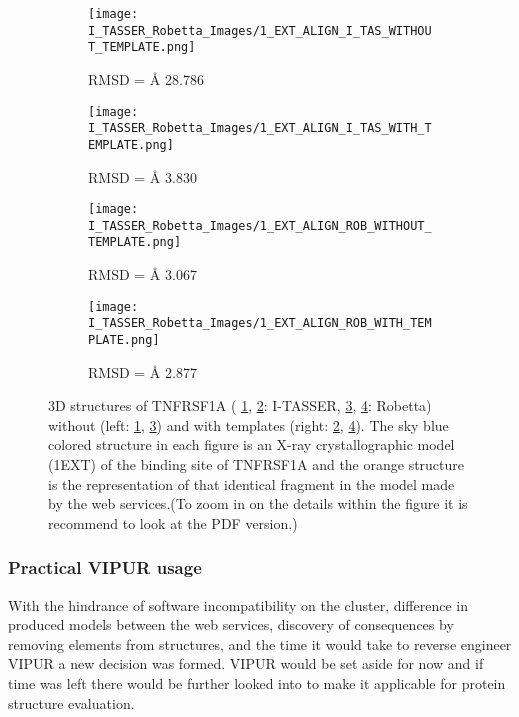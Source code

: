 	\begin{figure}[!ht]
		\centering
		\begin{subfigure}{0.49\textwidth}
			\texttt{[image: I\_TASSER\_Robetta\_Images/1\_EXT\_ALIGN\_I\_TAS\_WITHOUT\_TEMPLATE.png]}
			\caption{RMSD = {\AA} 28.786}
			\label{fig:RES_I_TASSER_Without}
		\end{subfigure}
		\begin{subfigure}{0.49\textwidth}
			\texttt{[image: I\_TASSER\_Robetta\_Images/1\_EXT\_ALIGN\_I\_TAS\_WITH\_TEMPLATE.png]}
			\caption{RMSD = {\AA} 3.830}
			\label{fig:RES_I_TASSER_With}
		\end{subfigure}
		\par\bigskip
		\begin{subfigure}{0.49\textwidth}
			\texttt{[image: I\_TASSER\_Robetta\_Images/1\_EXT\_ALIGN\_ROB\_WITHOUT\_TEMPLATE.png]}
			\caption{RMSD =  {\AA} 3.067}
			\label{fig:RES_Robetta_Without}
		\end{subfigure}
		\begin{subfigure}{0.49\textwidth}
			\texttt{[image: I\_TASSER\_Robetta\_Images/1\_EXT\_ALIGN\_ROB\_WITH\_TEMPLATE.png]}
			\caption{RMSD =  {\AA} 2.877}
			\label{fig:RES_Robetta_With}
		\end{subfigure}
		\caption[I-TASSER and Robetta models with and without templates]{3D structures of TNFRSF1A ( \ref{fig:RES_I_TASSER_Without}, \ref{fig:RES_I_TASSER_With}: I-TASSER, \ref{fig:RES_Robetta_Without}, \ref{fig:RES_Robetta_With}: Robetta) without (left: \ref{fig:RES_I_TASSER_Without}, \ref{fig:RES_Robetta_Without}) and with templates (right: \ref{fig:RES_I_TASSER_With}, \ref{fig:RES_Robetta_With}). The sky blue colored structure in each figure is an X-ray crystallographic model (1EXT) of the binding site of TNFRSF1A and the orange structure is the representation of that identical fragment in the model made by the web services.(To zoom in on the details within the figure it is recommend to look at the PDF version.)}
		\label{fig:I_Tasser_Robetta_models}
	\end{figure}
	\label{subsubsec:RES_Expanding_Models}
	
	\subsubsection{Practical VIPUR usage}
	With the hindrance of software incompatibility on the cluster, difference in produced models between the web services, discovery of consequences by removing elements from structures, and the time it would take to reverse engineer VIPUR a new decision was formed. VIPUR would be set aside for now and if time was left there would be further looked into to make it applicable for protein structure evaluation.

